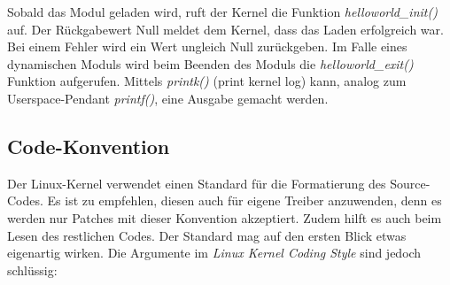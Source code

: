 Sobald das Modul geladen wird, ruft der Kernel die Funktion \emph{helloworld\_init()} auf. Der Rückgabewert Null meldet dem Kernel, dass das Laden erfolgreich war. Bei einem Fehler wird ein Wert ungleich
Null zurückgeben. Im Falle eines dynamischen Moduls wird beim Beenden des Moduls die \emph{helloworld\_exit()} Funktion aufgerufen. 
Mittels \emph{printk()} (print kernel log) kann, analog zum Userspace-Pendant \emph{printf()}, eine Ausgabe gemacht werden.

\subsection{Code-Konvention}

Der Linux-Kernel verwendet einen Standard für die Formatierung des Source-Codes. Es ist zu empfehlen, diesen auch für eigene Treiber anzuwenden,
denn es werden nur Patches mit dieser Konvention akzeptiert. Zudem hilft es auch beim Lesen des restlichen Codes. Der Standard mag auf den ersten
Blick etwas eigenartig wirken. Die Argumente im \emph{Linux Kernel Coding Style} \cite{lkcs} sind jedoch schlüssig:

